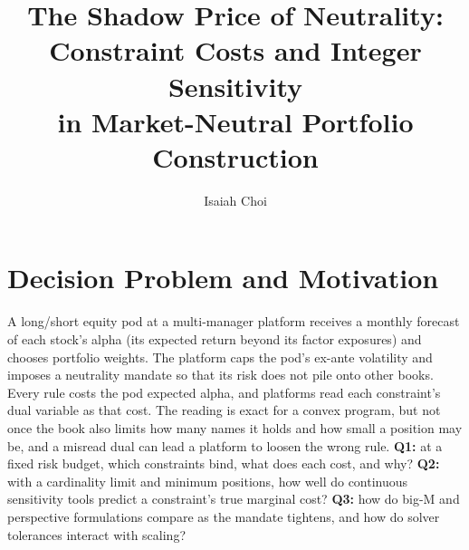 \documentclass[11pt]{article}
\title{\vspace{-2.5em}\Large The Shadow Price of Neutrality: Constraint Costs and Integer Sensitivity\\ in Market-Neutral Portfolio Construction}
\author{Isaiah Choi \quad{\small ENGS 104 project proposal (individual project), October 22, 2026}}
\date{\vspace{-3em}}
\begin{document}
\maketitle

\section{Decision Problem and Motivation}
A long/short equity pod at a multi-manager platform receives a monthly forecast of each stock's alpha (its expected return beyond its factor exposures) and chooses portfolio weights. The platform caps the pod's ex-ante volatility and imposes a neutrality mandate so that its risk does not pile onto other books. Every rule costs the pod expected alpha, and platforms read each constraint's dual variable as that cost. The reading is exact for a convex program, but not once the book also limits how many names it holds and how small a position may be, and a misread dual can lead a platform to loosen the wrong rule. \textbf{Q1:} at a fixed risk budget, which constraints bind, what does each cost, and why? \textbf{Q2:} with a cardinality limit and minimum positions, how well do continuous sensitivity tools predict a constraint's true marginal cost? \textbf{Q3:} how do big-M and perspective formulations compare as the mandate tightens, and how do solver tolerances interact with scaling?

\end{document}
